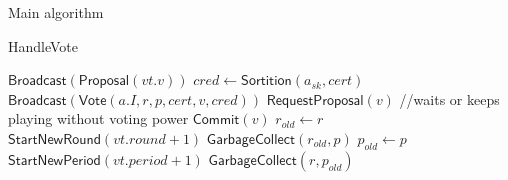 \documentclass[10pt,a4paper]{article}
\begin{document}
\begin{section}{Main algorithm}
\begin{subsection}{HandleVote}
\begin{algorithm}[H]
\begin{algorithmic}[1]
                    \State $\mathsf{Broadcast}(\mathsf{Proposal}(vt.v))$
                \EndIf
                        \State $cred \gets 
                        \mathsf{Sortition}(a_{sk}, cert)$
                            \State $\mathsf{Broadcast}(\mathsf{Vote}(a.I, r, p, cert, v, cred))$
                        \EndIf
                    \EndFor
                \EndIf
                        \State $\mathsf{RequestProposal}(v)$ //waits or keeps playing without voting power
                    \EndIf
                    \State $\mathsf{Commit}(v)$  %
                    \State $r_{old} \gets r$
                    \State $\mathsf{StartNewRound}(vt.round+1)$
                    \State $\mathsf{GarbageCollect}(r_{old}, p)$
                \EndIf
                    \State $p_{old} \gets p$
                    \State $\mathsf{StartNewPeriod}(vt.period + 1)$
                    \State $\mathsf{GarbageCollect}(r, p_{old})$
                \EndIf
            \EndIf

        \EndFunction
        \end{algorithmic}
    \end{algorithm}
    

\end{subsection}
\end{section}
\end{document}
